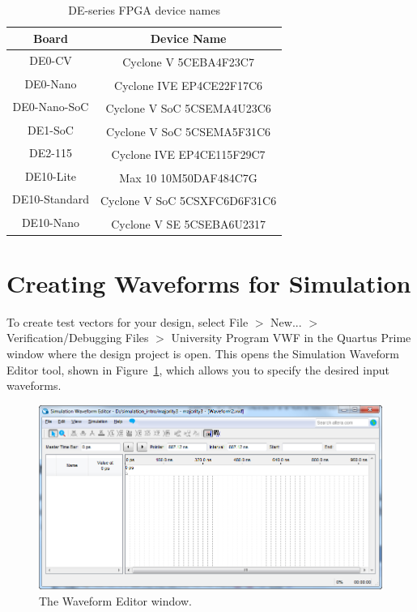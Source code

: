 \documentclass[11pt, twoside, pdftex]{article}
\begin{document}
\begin{table}[H]
	\begin{center}
	\begin{tabular}{| c | c |}
	\hline
	Board & Device Name \\
	\hline
	DE0-CV & Cyclone\textsuperscript{\textregistered} V 5CEBA4F23C7 \\
	\hline
	DE0-Nano & Cyclone\textsuperscript{\textregistered} IVE EP4CE22F17C6 \\
	\hline
	DE0-Nano-SoC & Cyclone\textsuperscript{\textregistered} V SoC 5CSEMA4U23C6 \\
	\hline
	DE1-SoC & Cyclone\textsuperscript{\textregistered} V SoC 5CSEMA5F31C6 \\
	\hline
	DE2-115 & Cyclone\textsuperscript{\textregistered} IVE EP4CE115F29C7 \\
	\hline
	DE10-Lite & Max\textsuperscript{\textregistered} 10 10M50DAF484C7G \\
	\hline
	DE10-Standard & Cyclone\textsuperscript{\textregistered} V SoC 5CSXFC6D6F31C6 \\
	\hline
	DE10-Nano & Cyclone\textsuperscript{\textregistered} V SE 5CSEBA6U2317 \\
	\hline
	\end{tabular}
	\caption{DE-series FPGA device names}
	\label{tab:device}
	\end{center}
\end{table}

\section{Creating Waveforms for Simulation}
\label{sec:creating_waveforms_for_simulation}

To create test vectors for your design, select {\sf File $>$ New... $>$ Verification/Debugging Files $>$ University Program VWF} in the Quartus Prime window where the design project is open.
This opens the Simulation Waveform Editor tool, shown in Figure~\ref{fig:5}, which allows you to specify the desired input waveforms.

\begin{figure}[H]
   \begin{center}
      \includegraphics[scale=0.65]{figures/figure5.png}
   \caption{The Waveform Editor window.} 
	 \label{fig:5}
	 \end{center}
\end{figure}
\end{document}
